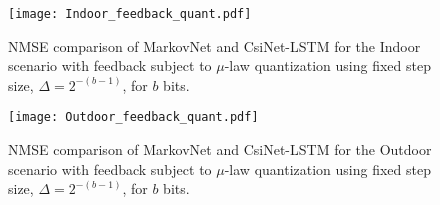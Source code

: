 \begin{figure}[!hbtp] \centering 
	\texttt{[image: Indoor\_feedback\_quant.pdf]}
    \caption{NMSE comparison of MarkovNet and CsiNet-LSTM for the Indoor scenario with feedback subject to $\mu$-law quantization using fixed step size, $\Delta=2^{-(b-1)}$, for $b$ bits.}
	\label{fig:feedback_quant_indoor} \vspace*{-2mm}
\end{figure}

\begin{figure}[!hbtp] \centering 
	\texttt{[image: Outdoor\_feedback\_quant.pdf]}
    \caption{NMSE comparison of MarkovNet and CsiNet-LSTM for the Outdoor scenario with feedback subject to $\mu$-law quantization using fixed step size, $\Delta=2^{-(b-1)}$, for $b$ bits.}
	\label{fig:feedback_quant_outdoor} \vspace*{-6mm}
\end{figure}